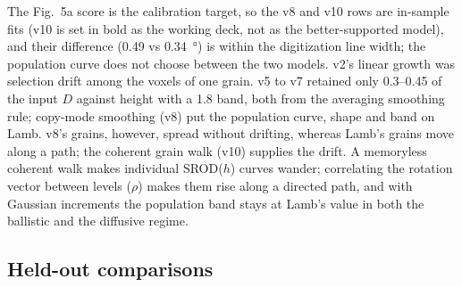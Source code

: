 \documentclass[11pt,a4paper]{article}
\begin{document}
The Fig.~5a score is the calibration target, so the v8 and v10 rows are in-sample fits (v10 is set in bold as the working deck, not as the better-supported model), and their difference (0.49 vs \SI{0.34}{\degree}) is within the digitization line width; the population curve does not choose between the two models. v2's linear growth was selection drift among the voxels of one grain. v5 to v7 retained only 0.3--0.45 of the input $D$ against height with a 1.8 band, both from the averaging smoothing rule; copy-mode smoothing (v8) put the population curve, shape and band on Lamb. v8's grains, however, spread without drifting, whereas Lamb's grains move along a path; the coherent grain walk (v10) supplies the drift. A memoryless coherent walk makes individual SROD($h$) curves wander; correlating the rotation vector between levels ($\rho$) makes them rise along a directed path, and with Gaussian increments the population band stays at Lamb's value in both the ballistic and the diffusive regime.

\subsection{Held-out comparisons}
\label{sec:heldout}
\begin{table}[htbp]
\centering\small
\caption{Targets not used in calibration. Established class: simulated grains crossing a \SI{240}{\micro\metre} floor, referenced at their floor-slice centroid, against Lamb Fig.~5c over 25--\SI{233}{\micro\metre}. 2026 Fig.~7a: voxel-weighted SROD distribution against distance from the grain start, digitized from the heatmap (the mode is the usable statistic; the density-weighted mean is raised by grains starting at the volume floor).}
\label{tab:heldout}
\end{table}
\end{document}
